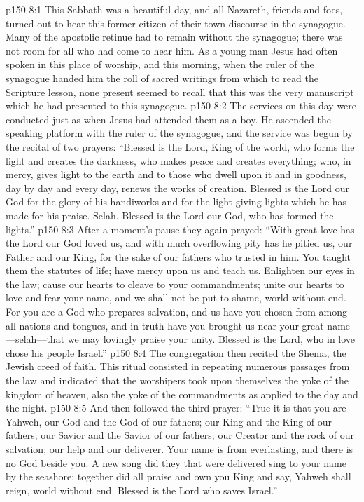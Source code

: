 \vs p150 8:1 This Sabbath was a beautiful day, and all Nazareth, friends and foes, turned out to hear this former citizen of their town discourse in the synagogue. Many of the apostolic retinue had to remain without the synagogue; there was not room for all who had come to hear him. As a young man Jesus had often spoken in this place of worship, and this morning, when the ruler of the synagogue handed him the roll of sacred writings from which to read the Scripture lesson, none present seemed to recall that this was the very manuscript which he had presented to this synagogue.
\vs p150 8:2 The services on this day were conducted just as when Jesus had attended them as a boy. He ascended the speaking platform with the ruler of the synagogue, and the service was begun by the recital of two prayers: “Blessed is the Lord, King of the world, who forms the light and creates the darkness, who makes peace and creates everything; who, in mercy, gives light to the earth and to those who dwell upon it and in goodness, day by day and every day, renews the works of creation. Blessed is the Lord our God for the glory of his handiworks and for the light\hyp{}giving lights which he has made for his praise. Selah. Blessed is the Lord our God, who has formed the lights.”\plusone
\vs p150 8:3 After a moment’s pause they again prayed: “With great love has the Lord our God loved us, and with much overflowing pity has he pitied us, our Father and our King, for the sake of our fathers who trusted in him. You taught them the statutes of life; have mercy upon us and teach us. Enlighten our eyes in the law; cause our hearts to cleave to your commandments; unite our hearts to love and fear your name, and we shall not be put to shame, world without end. For you are a God who prepares salvation, and us have you chosen from among all nations and tongues, and in truth have you brought us near your great name---selah---that we may lovingly praise your unity. Blessed is the Lord, who in love chose his people Israel.”
\vs p150 8:4 The congregation then recited the Shema, the Jewish creed of faith. This ritual consisted in repeating numerous passages from the law and indicated that the worshipers took upon themselves the yoke of the kingdom of heaven, also the yoke of the commandments as applied to the day and the night.
\vs p150 8:5 And then followed the third prayer: “True it is that you are Yahweh, our God and the God of our fathers; our King and the King of our fathers; our Savior and the Savior of our fathers; our Creator and the rock of our salvation; our help and our deliverer. Your name is from everlasting, and there is no God beside you. A new song did they that were delivered sing to your name by the seashore; together did all praise and own you King and say, Yahweh shall reign, world without end. Blessed is the Lord who saves Israel.”
